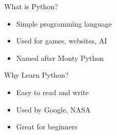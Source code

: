 \begin{frame}{What is Python?}
    \begin{itemize}
      \item Simple programming language
      \item Used for games, websites, AI
      \item Named after Monty Python
    \end{itemize}
    
    \begin{block}{Why Learn Python?}
      \begin{itemize}
        \item Easy to read and write
        \item Used by Google, NASA
        \item Great for beginners
      \end{itemize}
    \end{block}
  \end{frame}
